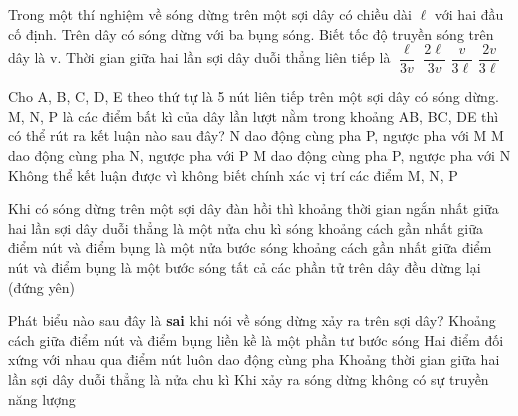 \begin{ex}%
Trong một thí nghiệm về sóng dừng trên một sợi dây có chiều dài $\ell$ với hai đầu cố định. Trên dây có sóng dừng với ba bụng sóng. Biết tốc độ truyền sóng trên dây là v. Thời gian giữa hai lần sợi dây duỗi thẳng liên tiếp là
\choice
{\True $\dfrac{\ell}{3v}$}
{$\dfrac{2\ell}{3v}$}
{$\dfrac{v}{3\ell}$}
{$\dfrac{2v}{3\ell}$}
\end{ex} 
\begin{ex}%
Cho A, B, C, D, E theo thứ tự là 5 nút liên tiếp trên một sợi dây có sóng dừng. M, N, P là các điểm bất kì của dây lần lượt nằm trong khoảng AB, BC, DE thì có thể rút ra kết luận nào sau đây?
\choice
{\True N dao động cùng pha P, ngược pha với M}
{M dao động cùng pha N, ngược pha với P}
{M dao động cùng pha P, ngược pha với N}
{Không thể kết luận được vì không biết chính xác vị trí các điểm M, N, P}
\end{ex} 

\begin{ex}%
Khi có sóng dừng trên một sợi dây đàn hồi thì
\choice
{\True khoảng thời gian ngắn nhất giữa hai lần sợi dây duỗi thẳng là một nửa chu kì sóng}
{khoảng cách gần nhất giữa điểm nút và điểm bụng là một nửa bước sóng}
{khoảng cách gần nhất giữa điểm nút và điểm bụng là một bước sóng}
{tất cả các phần tử trên dây đều dừng lại (đứng yên)}
\end{ex} 


\begin{ex}%
Phát biểu nào sau đây là \textbf{sai} khi nói về sóng dừng xảy ra trên sợi dây?
\choice
{Khoảng cách giữa điểm nút và điểm bụng liền kề là một phần tư bước sóng}
{\True Hai điểm đối xứng với nhau qua điểm nút luôn dao động cùng pha}
{Khoảng thời gian giữa hai lần sợi dây duỗi thẳng là nửa chu kì}
{Khi xảy ra sóng dừng không có sự truyền năng lượng}
\end{ex} 

